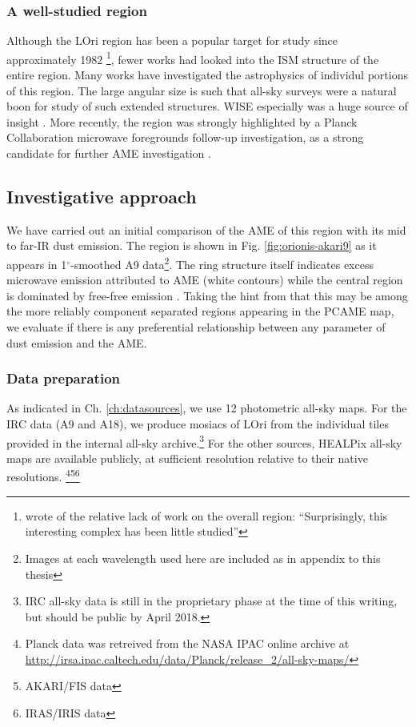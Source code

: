   \subsubsection{A well-studied region}
    Although the LOri region has been a popular target for study since approximately 1982 \footnote{\cite{duerr82} wrote of the relative lack of work on the overall region: ``Surprisingly, this interesting complex has been little studied''}, fewer works had looked into the ISM structure of the entire region.  Many works have investigated the astrophysics of individul portions of this region. The large angular size is such that all-sky surveys were a natural boon for study of such extended structures. WISE especially was a huge source of insight \citep{koenig15}. More recently, the region was strongly highlighted by a Planck Collaboration microwave foregrounds follow-up investigation, as a strong candidate for further AME investigation \citep{planck15XXV}.


	\subsection{Investigative approach}

      We have carried out an initial comparison of the AME of this region with its mid to far-IR dust emission. The region is shown in Fig. \ref{fig:orionis-akari9} as it appears in 1$^{\circ}$-smoothed A9 data\footnote{Images at each wavelength used here are included as in appendix to this thesis}. The ring structure itself indicates excess microwave emission attributed to AME (white contours) while the central region is dominated by free-free emission \citep{aran09, koenig15,planck15XXV}. Taking the hint from \cite{planck15XXV} that this may be among the more reliably component separated regions appearing in the PCAME map, we evaluate if there is any preferential relationship between any parameter of dust emission and the AME.

		\subsubsection{Data preparation}
			As indicated in Ch. \hyperref[ch:datasources]{\ref{ch:datasources}}, we use 12 photometric all-sky maps. For the IRC data (A9 and A18), we produce mosiacs of LOri from the individual tiles provided in the internal all-sky archive.\footnote{IRC all-sky data is still in the proprietary phase at the time of this writing, but should be public by April 2018.} For the other sources, HEALPix all-sky maps are available publicly, at sufficient resolution relative to their native resolutions. \footnote{Planck data was retreived from the NASA IPAC online archive at \url{http://irsa.ipac.caltech.edu/data/Planck/release_2/all-sky-maps/}}\footnote{AKARI/FIS data }\footnote{IRAS/IRIS data }

